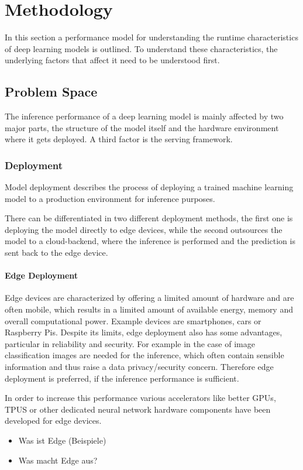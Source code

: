 \chapter{Methodology}
In this section a performance model for understanding the runtime characteristics of deep learning models is outlined. To understand these characteristics, the underlying factors that affect it need to be understood first. 


\section{Problem Space}
The inference performance of a deep learning model is mainly affected by two major parts, the structure of the model itself and the hardware environment where it gets deployed. A third factor is the serving framework.

\subsection{Deployment}
Model deployment describes the process of deploying a trained machine learning model to a production environment for inference purposes. 

There can be differentiated in two different deployment methods, the first one is deploying the model directly to edge devices, while the second outsources the model to a cloud-backend, where the inference is performed and the prediction is sent back to the edge device.
\subsubsection{Edge Deployment}
Edge devices are characterized by offering a limited amount of hardware and are often mobile, which results in a limited amount of available energy, memory and overall computational power.
Example devices are smartphones, cars or Raspberry Pis.
Despite its limits, edge deployment also has some advantages, particular in reliability and security. 
For example in the case of image classification images are needed for the inference, which often contain sensible information and thus raise a data privacy/security concern.
Therefore edge deployment is preferred, if the inference performance is sufficient.

In order to increase this performance various accelerators like better GPUs, TPUS or other dedicated neural network hardware components have been developed for edge devices.

\begin{itemize}
    \item Was ist Edge (Beispiele)
    \item Was macht Edge aus?
\end{itemize}
